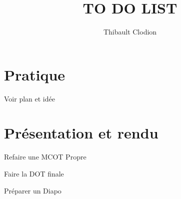\documentclass{article}
\title{TO DO LIST}
\author{Thibault Clodion}
\begin{document}
\maketitle %


\section{Pratique}

\begin{todolist}
    \item Voir plan et idée
\end{todolist}

\section{Présentation et rendu}

\begin{todolist}
    \item Refaire une MCOT Propre
    \item Faire la DOT finale
    \item Préparer un Diapo
\end{todolist}
\end{document}

